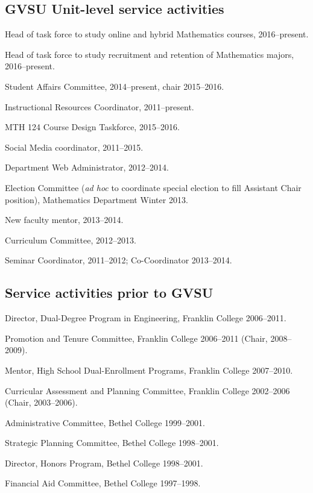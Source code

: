 \documentclass[letterpaper]{article}
\renewenvironment{itemize}{
  \begin{list}{}{
    \setlength{\leftmargin}{1.5em}
	\setlength{\itemsep}{0in}
  }
}{
  \end{list}
}
\begin{document}
\subsection*{GVSU Unit-level service activities}


\begin{itemize}
	\item Head of task force to study online and hybrid Mathematics courses, 2016--present.
	\item Head of task force to study recruitment and retention of Mathematics majors, 2016--present.
	\item Student Affairs Committee, 2014--present, chair 2015--2016.
	\item Instructional Resources Coordinator, 2011--present.
	\item MTH 124 Course Design Taskforce, 2015--2016.
	\item Social Media coordinator, 2011--2015.
	\item Department Web Administrator, 2012--2014.
	\item Election Committee (\emph{ad hoc} to coordinate special election to fill Assistant Chair position), Mathematics Department Winter 2013.
	\item New faculty mentor, 2013--2014.
	\item Curriculum Committee, 2012--2013.
	\item Seminar Coordinator, 2011--2012; Co-Coordinator 2013--2014.
\end{itemize}


\subsection*{Service activities prior to GVSU}
\begin{itemize}
	\item Director, Dual-Degree Program in Engineering, Franklin College 2006--2011.
	\item Promotion and Tenure Committee, Franklin College 2006--2011 (Chair, 2008--2009).
	\item Mentor, High School Dual-Enrollment Programs, Franklin College 2007--2010.
	\item Curricular Assessment and Planning Committee, Franklin College 2002--2006 (Chair, 2003--2006).
	\item Administrative Committee, Bethel College 1999--2001.
	\item Strategic Planning Committee, Bethel College 1998--2001.
	\item Director, Honors Program, Bethel College 1998--2001.
	\item Financial Aid Committee, Bethel College 1997--1998.
\end{itemize}
\end{document}
